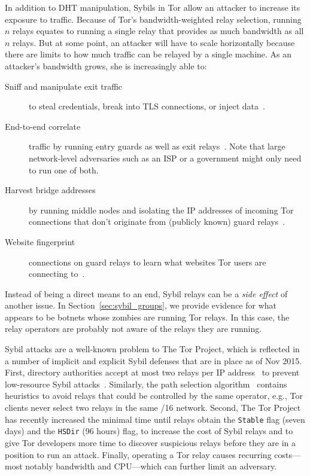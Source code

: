 In addition to DHT manipulation, Sybils in Tor allow an attacker to increase its
exposure to traffic.  Because of Tor's bandwidth-weighted relay selection,
running $n$ relays equates to running a single relay that provides as much
bandwidth as all $n$ relays.  But at some point, an attacker will have to scale
horizontally because there are limits to how much traffic can be relayed by a
single machine.  As an attacker's bandwidth grows, she is increasingly able to:
\begin{description}
	\item[Sniff and manipulate exit traffic] to steal credentials, break into
		TLS connections, or inject data~\cite{Winter2014a}.
	\item[End-to-end correlate] traffic by running entry guards as well as exit
		relays~\cite{Johnson2013a}.  Note that large network-level adversaries
		such as an ISP or a government might only need to run one of both.
	\item[Harvest bridge addresses] by running middle nodes and isolating the
		IP addresses of incoming Tor connections that don't originate from
		(publicly known) guard relays~\cite{Ling2012a}.
	\item[Website fingerprint] connections on guard relays to learn what
		websites Tor users are connecting to~\cite{Juarez2014a}.
\end{description}

Instead of being a direct means to an end, Sybil relays can be a \emph{side
effect} of another issue.  In Section~\ref{sec:sybil_groups}, we provide
evidence for what appears to be botnets whose zombies are running Tor relays.
In this case, the relay operators are probably not aware of the relays they are
running.

Sybil attacks are a well-known problem to The Tor Project, which is reflected in
a number of implicit and explicit Sybil defenses that are in place as of Nov
2015.  First, directory authorities accept at most two relays per IP
address~\cite{Bauer2007b} to prevent low-resource Sybil
attacks~\cite{Bauer2007a}.  Similarly, the path selection
algorithm~\cite{path-spec} contains heuristics to avoid relays that could be
controlled by the same operator, e.g., Tor clients never select two relays in
the same /16 network.  Second, The Tor Project has recently increased the
minimal time until relays obtain the \texttt{Stable} flag (seven days) and the
\texttt{HSDir} (96 hours) flag, to increase the cost of Sybil relays and to give
Tor developers more time to discover suspicious relays before they are in a
position to run an attack.  Finally, operating a Tor relay causes recurring
costs---most notably bandwidth and CPU---which can further limit an adversary.

